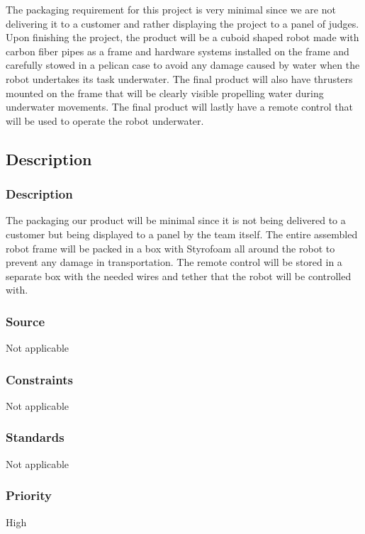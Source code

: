 The packaging requirement for this project is very minimal since we are not delivering it to a customer and rather displaying the project to a panel of judges. Upon finishing the project, the product will be a cuboid shaped robot made with carbon fiber pipes as a frame and hardware systems installed on the frame and carefully stowed in a pelican case to avoid any damage caused by water when the robot undertakes its task underwater. The final product will also have thrusters mounted on the frame that will be clearly visible propelling water during underwater movements. The final product will lastly have a remote control that will be used to operate the robot underwater. 

\subsection{Description  }
\subsubsection{Description}
The packaging our product will be minimal since it is not being delivered to a customer but being displayed to a panel by the team itself. The entire assembled robot frame will be packed in a box with Styrofoam all around the robot to prevent any damage in transportation. The remote control will be stored in a separate box with the needed wires and tether that the robot will be controlled with.  
\subsubsection{Source}
Not applicable  
\subsubsection{Constraints}
Not applicable
\subsubsection{Standards}
Not applicable  
\subsubsection{Priority}
High